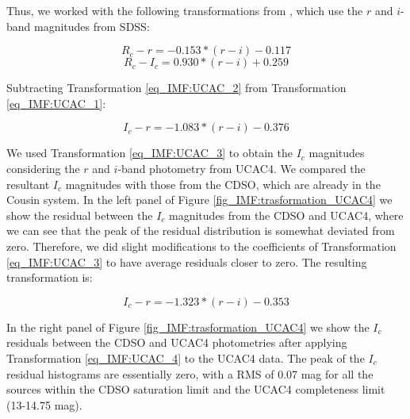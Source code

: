 \documentclass[12pt]{article}
\begin{document}
Thus, we worked with the following transformations from \citet{Jordi2006}, which use the $r$ and $i$-band magnitudes from SDSS:

\begin{equation} \label{eq_IMF:UCAC_1}
	R_c-r = -0.153*(r-i) - 0.117
\end{equation}
\begin{equation} \label{eq_IMF:UCAC_2}
	R_c-I_c = 0.930*(r-i) + 0.259
\end{equation}

Subtracting Transformation \ref{eq_IMF:UCAC_2} from Transformation \ref{eq_IMF:UCAC_1}:

\begin{equation} \label{eq_IMF:UCAC_3}
	I_c-r = -1.083*(r-i) -0.376
\end{equation}

We used Transformation \ref{eq_IMF:UCAC_3} to obtain the $I_c$ magnitudes considering the $r$ and $i$-band photometry from UCAC4. We compared the resultant $I_c$ magnitudes with those from the CDSO, which are already in the Cousin system. In the left panel of Figure \ref{fig_IMF:trasformation_UCAC4} we show the residual between the $I_c$ magnitudes from the CDSO and UCAC4, where we can see that the peak of the residual distribution is somewhat deviated from zero. Therefore, we did slight modifications to the coefficients of Transformation \ref{eq_IMF:UCAC_3} to have average residuals closer to zero. The resulting transformation is:

\begin{equation} \label{eq_IMF:UCAC_4}
	I_c-r = -1.323*(r-i) -0.353
\end{equation}

In the right panel of Figure \ref{fig_IMF:trasformation_UCAC4} we show the $I_c$ residuals between the CDSO and UCAC4 photometries after applying Transformation \ref{eq_IMF:UCAC_4} to the UCAC4 data. The peak of the $I_c$ residual histograms are essentially zero, with a RMS of 0.07 mag for all the sources within the CDSO saturation limit and the UCAC4 completeness limit (13-14.75 mag).
\end{document}
